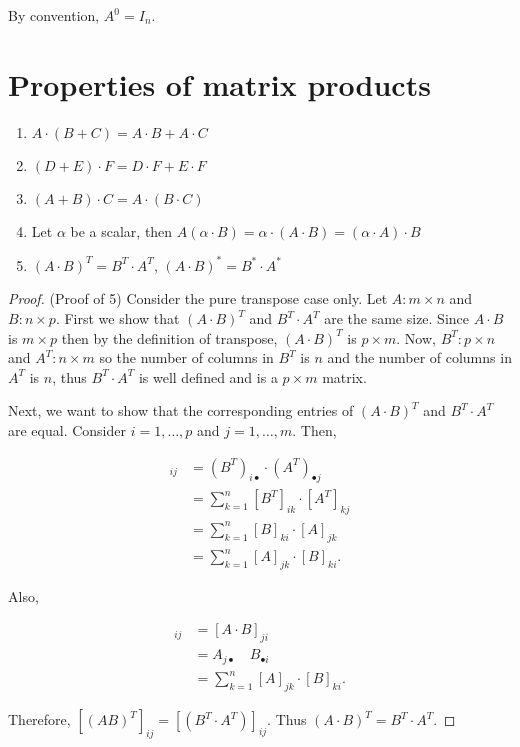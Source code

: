 \documentclass[12pt]{article}
\theoremstyle{definition}
\begin{document}
By convention, $A^0 = I_n$.

\section{Properties of matrix products}

\begin{enumerate}
\item $A \cdot (B + C) = A \cdot B + A \cdot C$
\item $(D + E) \cdot F = D \cdot F + E \cdot F$
\item $(A + B) \cdot C = A \cdot (B \cdot C)$
\item Let $\alpha$ be a scalar, then $A(\alpha \cdot B) = \alpha \cdot (A \cdot B) = (\alpha \cdot A) \cdot B$
\item $(A \cdot B)^T = B^T \cdot A^T$, $(A \cdot B)^* = B^* \cdot A^*$
\end{enumerate}

\begin{proof}
(Proof of 5) Consider the pure transpose case only. Let $A : m \times n$ and $B : n \times p$. First we show that
$(A \cdot B)^T$ and $B^T \cdot A^T$ are the same size. Since $A \cdot B$ is $m \times p$ then by the definition of
transpose, $(A \cdot B)^T$ is $p \times m$. Now, $B^T : p \times n$ and $A^T : n \times m$ so the number of 
columns in $B^T$ is $n$ and the number of columns in $A^T$ is $n$, thus $B^T \cdot A^T$ is well defined and
is a $p \times m$ matrix.

Next, we want to show that the corresponding entries of $(A \cdot B)^T$ and $B^T \cdot A^T$ are equal. Consider
$i = 1, \ldots, p$ and $j = 1, \ldots, m$. Then,

\begin{align*}
[(B^T \cdot A^T)]_{ij} &= (B^T)_{i \bullet} \cdot (A^T)_{\bullet j} \\
&= \sum^{n}_{k=1} [B^T]_{ik} \cdot [A^T]_{kj} \\
&= \sum^{n}_{k=1} [B]_{ki} \cdot [A]_{jk} \\
&= \sum^{n}_{k=1} [A]_{jk} \cdot [B]_{ki}.
\end{align*}

Also,

\begin{align*}
[(A \cdot B)^T]_{ij} &= [A \cdot B]_{ji} \\
&= A_{j \bullet} \quad B_{\bullet i} \\
&= \sum_{k = 1}^{n} [A]_{jk} \cdot [B]_{ki}.
\end{align*}

Therefore, $[(AB)^T]_{ij} = [(B^T \cdot A^T)]_{ij}$. Thus $(A \cdot B)^T = B^T \cdot A^T$.

\end{proof}
\end{document}
